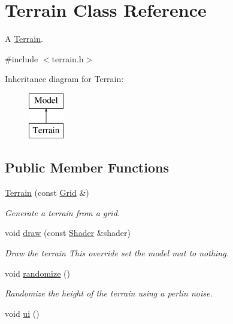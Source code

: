 \hypertarget{classTerrain}{}\section{Terrain Class Reference}
\label{classTerrain}


A \hyperlink{classTerrain}{Terrain}.  




{\ttfamily \#include $<$terrain.\+h$>$}

Inheritance diagram for Terrain\+:\begin{figure}[H]
\begin{center}
\leavevmode
\includegraphics[height=2.000000cm]{classTerrain}
\end{center}
\end{figure}
\subsection*{Public Member Functions}
\begin{DoxyCompactItemize}
\item 
\hyperlink{classTerrain_afafc221c37b67156d8dedeeee5f9f0e5}{Terrain} (const \hyperlink{classGrid}{Grid} \&)
\begin{DoxyCompactList}\small\item\em Generate a terrain from a grid. \end{DoxyCompactList}\item 
void \hyperlink{classTerrain_ac3a615c383f37e7fc9894d20cc090da2}{draw} (const \hyperlink{classShader}{Shader} \&shader)
\begin{DoxyCompactList}\small\item\em Draw the terrain This override set the model mat to nothing. \end{DoxyCompactList}\item 
void \hyperlink{classTerrain_abc478a72ef7b4b9dae3911d1acee4c71}{randomize} ()
\begin{DoxyCompactList}\small\item\em Randomize the height of the terrain using a perlin noise. \end{DoxyCompactList}\item 
void \hyperlink{classTerrain_afff1911e27bd05cf1da59799db595322}{ui} ()
\end{DoxyCompactItemize}
